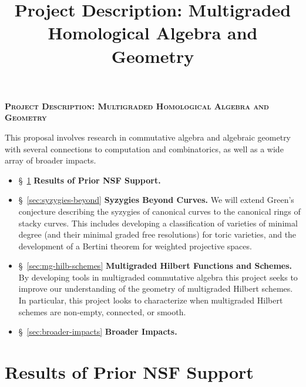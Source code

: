 \documentclass[11pt,reqno]{amsart}
\title{Project Description: Multigraded Homological Algebra and Geometry}
\theoremstyle{remark}
\begin{document}
 
\thispagestyle{empty}
\pagestyle{empty}
\begingroup  
  \centering
  \large\scshape\bfseries Project Description: Multigraded Homological Algebra and Geometry\\[1em]
\endgroup


\setcounter{section}{0}

\noindent This proposal involves research in commutative algebra and algebraic geometry with several connections to computation and combinatorics, as well as a wide array of broader  impacts.
\begin{itemize}[leftmargin=*]
	\item \S~\ref{sec:prior-work} \textbf{Results of Prior NSF Support.} 
	\item \S~\ref{sec:syzygies-beyond} \textbf{Syzygies Beyond Curves.} We will extend Green's conjecture describing the syzygies of canonical curves to the canonical rings of stacky curves. This includes developing a classification of varieties of minimal degree (and their minimal graded free resolutions) for toric varieties, and the development of a Bertini theorem for weighted projective spaces.  
	\item \S~\ref{sec:mg-hilb-schemes} \textbf{Multigraded Hilbert Functions and Schemes.} By developing tools in multigraded commutative algebra this project seeks to improve our understanding of the geometry of multigraded Hilbert schemes. In particular, this project looks to characterize when multigraded Hilbert schemes are non-empty, connected, or smooth.
	\item \S~\ref{sec:broader-impacts} \textbf{Broader Impacts.}
\end{itemize}

\section{Results of Prior NSF Support}\label{sec:prior-work}
\end{document}
